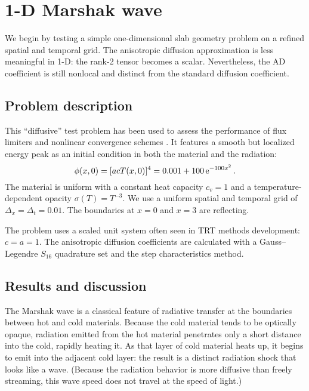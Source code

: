 \section{1-D Marshak wave}\label{sec:trtOned}
We begin by testing a simple one-dimensional slab geometry problem on a refined
spatial and temporal grid. The anisotropic diffusion approximation is less
meaningful in 1-D: the rank-2 tensor becomes a scalar. Nevertheless, the AD
coefficient is still nonlocal and distinct from the standard diffusion
coefficient.

\subsection{Problem description}
This ``diffusive'' test problem has been used to assess the
performance of flux limiters and nonlinear convergence schemes
\cite{Rau2005,Ols2007}. It features a smooth but
localized energy peak as an initial condition in both the material and the
radiation:
\begin{equation*}
  \phi(x,0) = [ a c T(x,0)]^{4} = 0.001 + 100 \mathop{}\!\mathrm{e}^{-100 x^2} \,.
\end{equation*}
The material is uniform with a constant heat capacity $c_v = 1$ and a
temperature-dependent
opacity $\sigma(T) = T^{-3}$. We use a uniform spatial and temporal grid of
$\Delta_x = \Delta_t = 0.01$. The boundaries at $x=0$ and $x=3$ are reflecting.

The problem uses a scaled unit system often seen in TRT methods development: $c
= a = 1$. The anisotropic diffusion coefficients are calculated with a
Gauss--Legendre $S_{16}$ quadrature set and the step characteristics method.

\subsection{Results and discussion}

The Marshak wave \cite{Mar1958} is a classical feature of radiative transfer at
the boundaries between hot and cold materials. Because the cold material tends
to be optically opaque, radiation emitted from the hot material penetrates only
a short distance into the cold, rapidly heating it. As that layer of cold
material heats up, it begins to emit into the adjacent cold layer: the result
is a distinct radiation shock that looks like a wave. (Because the radiation
behavior is more diffusive than freely streaming, this wave speed does not
travel at the speed of light.)

